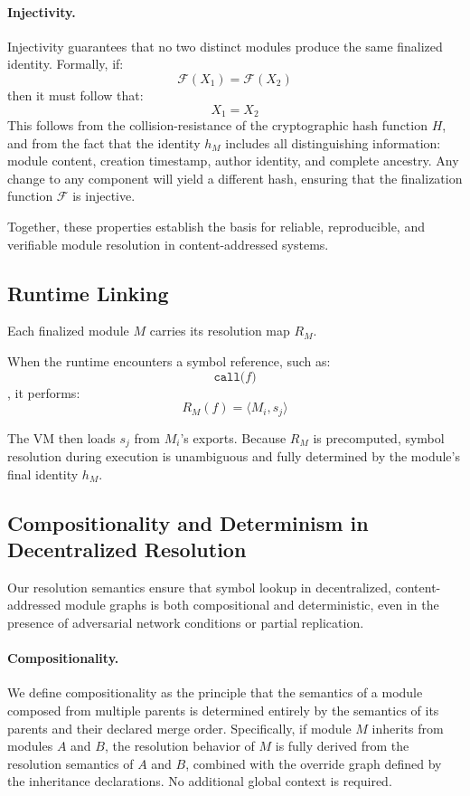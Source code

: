 \documentclass[sigplan,screen]{acmart}
\begin{document}
\paragraph{Injectivity.}
Injectivity guarantees that no two distinct modules produce the same finalized identity. Formally, if:
\[
\mathcal{F}(X_1) = \mathcal{F}(X_2)
\]
then it must follow that:
\[
X_1 = X_2
\]
This follows from the collision-resistance of the cryptographic hash function \( H \), and from the fact that the identity \( h_M \) includes all distinguishing information: module content, creation timestamp, author identity, and complete ancestry. Any change to any component will yield a different hash, ensuring that the finalization function \( \mathcal{F} \) is injective.

Together, these properties establish the basis for reliable, reproducible, and verifiable module resolution in content-addressed systems.

\subsection{Runtime Linking}

Each finalized module $M$ carries its resolution map $R_M$.

When the runtime encounters a symbol reference, such as:
\[ \texttt{call($f$)} \],
it performs:
\[
R_M(f) = \langle M_i, s_j \rangle
\]

The VM then loads $s_j$ from $M_i$'s exports. Because $R_M$ is precomputed, symbol resolution during execution is unambiguous and fully determined by the module's final identity $h_M$.

\subsection{Compositionality and Determinism in Decentralized Resolution}
\label{sec:formal-compositionality}

Our resolution semantics ensure that symbol lookup in decentralized, content-addressed module graphs is both compositional and deterministic, even in the presence of adversarial network conditions or partial replication.

\paragraph{Compositionality.}
We define compositionality as the principle that the semantics of a module composed from multiple parents is determined entirely by the semantics of its parents and their declared merge order. Specifically, if module \( M \) inherits from modules \( A \) and \( B \), the resolution behavior of \( M \) is fully derived from the resolution semantics of \( A \) and \( B \), combined with the override graph defined by the inheritance declarations. No additional global context is required.
\end{document}
